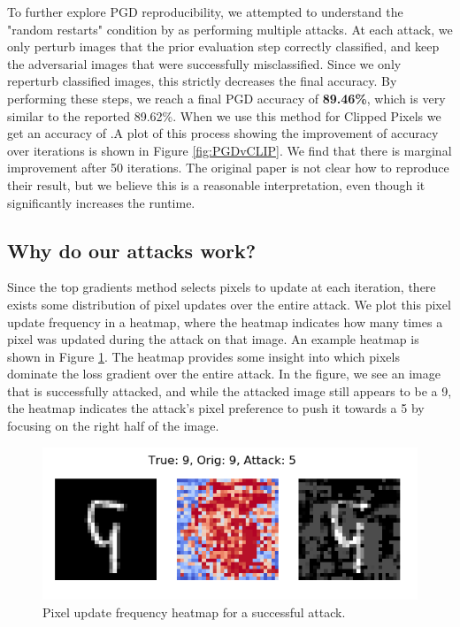To further explore PGD reproducibility, we attempted to understand the "random restarts" condition by as performing multiple attacks. At each attack, we only perturb images that the prior evaluation step correctly classified, and keep the adversarial images that were successfully misclassified. Since we only reperturb classified images, this strictly decreases the final accuracy. By performing these steps, we reach a final PGD accuracy of \textbf{89.46\%}, which is very similar to the reported 89.62\%. When we use this method for Clipped Pixels we get an accuracy of .A plot of this process showing the improvement of accuracy over iterations is shown in Figure \ref{fig:PGDvCLIP}. We find that there is marginal improvement after 50 iterations. The original paper is not clear how to reproduce their result, but we believe this is a reasonable interpretation, even though it significantly increases the runtime.

\subsection{Why do our attacks work?}
Since the top gradients method selects pixels to update at each iteration, there exists some distribution of pixel updates over the entire attack. We plot this pixel update frequency in a heatmap, where the heatmap indicates how many times a pixel was updated during the attack on that image. An example heatmap is shown in Figure \ref{fig:heatmap}. The heatmap provides some insight into which pixels dominate the loss gradient over the entire attack. In the figure, we see an image that is successfully attacked, and while the attacked image still appears to be a 9, the heatmap indicates the attack's pixel preference to push it towards a 5 by focusing on the right half of the image. 

\begin{figure}
    \centering
    \includegraphics{Report/sections/images/heatmap.png}
    \caption{Pixel update frequency heatmap for a successful attack.}
    \label{fig:heatmap}
\end{figure}


